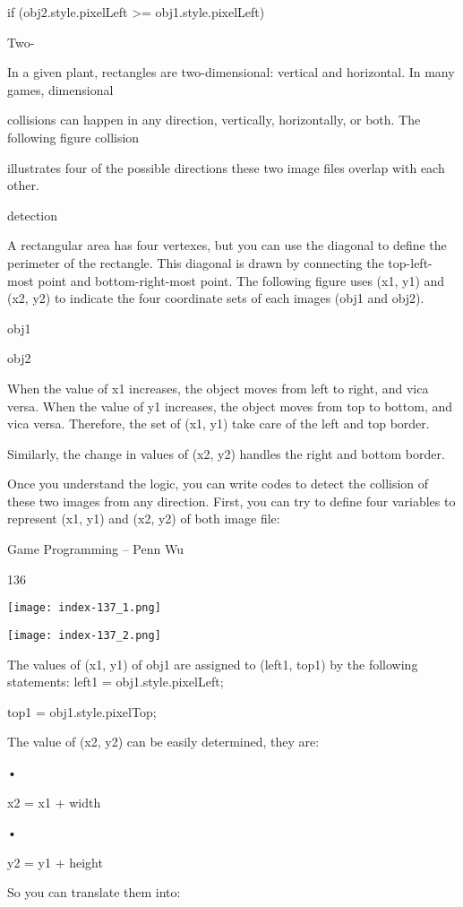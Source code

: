 \documentclass[
]{article}
\begin{document}
if (obj2.style.pixelLeft \textgreater= obj1.style.pixelLeft)

Two-

In a given plant, rectangles are two-dimensional: vertical and
horizontal. In many games, dimensional

collisions can happen in any direction, vertically, horizontally, or
both. The following figure collision

illustrates four of the possible directions these two image files
overlap with each other.

detection

A rectangular area has four vertexes, but you can use the diagonal to
define the perimeter of the rectangle. This diagonal is drawn by
connecting the top-left-most point and bottom-right-most point. The
following figure uses (x1, y1) and (x2, y2) to indicate the four
coordinate sets of each images (obj1 and obj2).

obj1

obj2

When the value of x1 increases, the object moves from left to right, and
vica versa. When the value of y1 increases, the object moves from top to
bottom, and vica versa. Therefore, the set of (x1, y1) take care of the
left and top border.

Similarly, the change in values of (x2, y2) handles the right and bottom
border.

Once you understand the logic, you can write codes to detect the
collision of these two images from any direction. First, you can try to
define four variables to represent (x1, y1) and (x2, y2) of both image
file:

Game Programming -- Penn Wu

136

\protect\hypertarget{index_split_009.htmlux5cux23p137}{}{}\texttt{[image: index-137\_1.png]}

\texttt{[image: index-137\_2.png]}

The values of (x1, y1) of obj1 are assigned to (left1, top1) by the
following statements: left1 = obj1.style.pixelLeft;

top1 = obj1.style.pixelTop;

The value of (x2, y2) can be easily determined, they are:

•

x2 = x1 + width

•

y2 = y1 + height

So you can translate them into:
\end{document}
